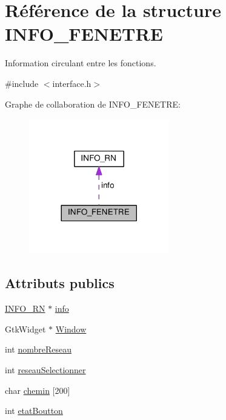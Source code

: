 \hypertarget{structINFO__FENETRE}{}\section{Référence de la structure I\+N\+F\+O\+\_\+\+F\+E\+N\+E\+T\+RE}
\label{structINFO__FENETRE}


Information circulant entre les fonctions.  




{\ttfamily \#include $<$interface.\+h$>$}



Graphe de collaboration de I\+N\+F\+O\+\_\+\+F\+E\+N\+E\+T\+RE\+:
\nopagebreak
\begin{figure}[H]
\begin{center}
\leavevmode
\includegraphics[width=173pt]{structINFO__FENETRE__coll__graph}
\end{center}
\end{figure}
\subsection*{Attributs publics}
\begin{DoxyCompactItemize}
\item 
\hyperlink{structINFO__RN}{I\+N\+F\+O\+\_\+\+RN} $\ast$ \hyperlink{structINFO__FENETRE_a11f9a61d9418b5b167ac2c2dbfa99dac}{info}
\item 
Gtk\+Widget $\ast$ \hyperlink{structINFO__FENETRE_ad55c62f85a92f3163bca921dc73336dc}{Window}
\item 
int \hyperlink{structINFO__FENETRE_ab88f2bbddff749e8003f2b3178fd5602}{nombre\+Reseau}
\item 
int \hyperlink{structINFO__FENETRE_a87ac81a3d0227737e3228bd5ad1f975d}{reseau\+Selectionner}
\item 
char \hyperlink{structINFO__FENETRE_a45ef7a5a1039c09dcb82975b4a070c21}{chemin} \mbox{[}200\mbox{]}
\item 
int \hyperlink{structINFO__FENETRE_ac0a8053617f09b84823e045c847bfdd6}{etat\+Boutton}
\end{DoxyCompactItemize}


